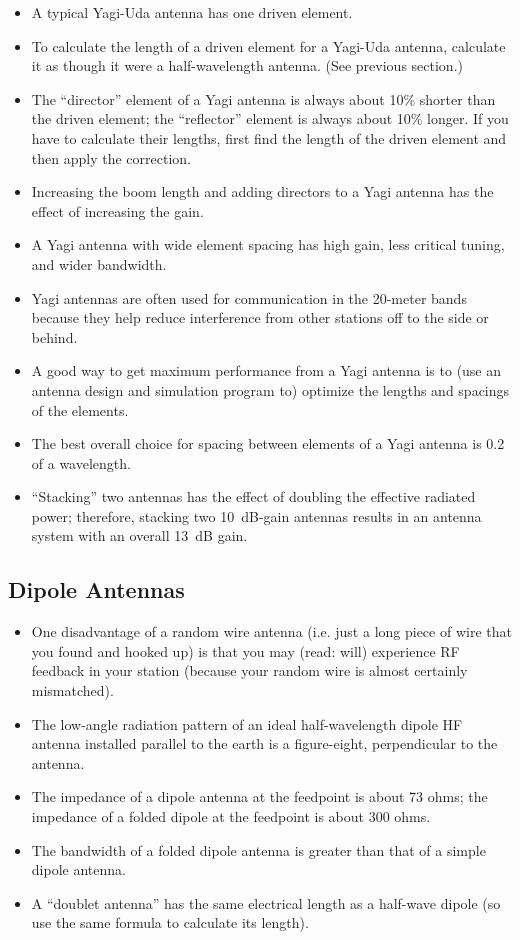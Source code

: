 \documentclass[letterpaper,12pt]{scrartcl}
\begin{document}
\begin{itemize}
\item A typical Yagi-Uda antenna has one driven element.
\item To calculate the length of a driven element for a Yagi-Uda antenna, calculate it as though it were a half-wavelength antenna. (See previous section.)
\item The ``director'' element of a Yagi antenna is always about 10\% shorter than the driven element; the ``reflector'' element
is always about 10\% longer. If you have to calculate their lengths, first find the length of the driven element and then apply the correction.
\item Increasing the boom length and adding directors to a Yagi antenna has the effect of increasing the gain.
\item A Yagi antenna with wide element spacing has high gain, less critical tuning, and wider bandwidth.
\item Yagi antennas are often used for communication in the 20-meter bands because they help reduce interference from other stations off to the side or behind.
\item A good way to get maximum performance from a Yagi antenna is to (use an antenna design and simulation program to) optimize the lengths and spacings of the elements.
\item The best overall choice for spacing between elements of a Yagi antenna is 0.2 of a wavelength.
\item ``Stacking'' two antennas has the effect of doubling the effective radiated power; therefore, stacking two 10~dB-gain antennas
results in an antenna system with an overall 13~dB gain.
\end{itemize}

\subsection{Dipole Antennas}

\begin{itemize}
\item One disadvantage of a random wire antenna (i.e. just a long piece of wire that you found and hooked up)
is that you may (read: will) experience RF feedback in your station (because your random wire is almost certainly mismatched).
\item The low-angle radiation pattern of an ideal half-wavelength dipole HF antenna installed parallel to the earth is a figure-eight, perpendicular to the antenna.
\item The impedance of a dipole antenna at the feedpoint is about 73 ohms; the impedance of a folded dipole at the feedpoint is about 300 ohms.
\item The bandwidth of a folded dipole antenna is greater than that of a simple dipole antenna.
\item A ``doublet antenna'' has the same electrical length as a half-wave dipole (so use the same formula to calculate its length).
\end{itemize}
\end{document}
